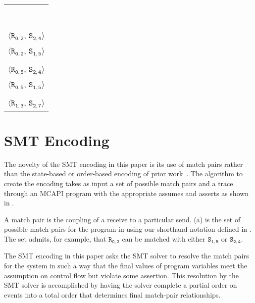 \newsavebox{\boxMP}
\begin{lrbox}{\boxMP}
\normalsize
\begin{tabular}[t]{l}
\\\\\\\\\\\\\\\\\\
$\langle\mathtt{R_{0,2}}$, $\mathtt{S_{2,4}}\rangle$\\
$\langle\mathtt{R_{0,2}}$, $\mathtt{S_{1,5}}\rangle$\\
\\
$\langle\mathtt{R_{0,5}}$, $\mathtt{S_{2,4}}\rangle$\\
$\langle\mathtt{R_{0,5}}$, $\mathtt{S_{1,5}}\rangle$\\
\\
$\langle\mathtt{R_{1,3}}$, $\mathtt{S_{2,7}}\rangle$\\
\end{tabular}
\end{lrbox}

\section{SMT Encoding}\label{sec:smt}

The novelty of the SMT encoding in this paper is its use of match
pairs rather than the state-based or order-based encoding of prior
work~\cite{elwakil:padtad10,elwakil:atva10}. The algorithm to create
the encoding takes as input a set of possible match pairs and a trace
through an MCAPI program with the appropriate assumes and asserts as
shown in .

A match pair is the coupling of a receive to a particular
send. (a) is the set of possible match pairs for the
program in  using our shorthand notation defined in
. The set admits, for example, that
$\mathtt{R_{0,2}}$ can be matched with either $\mathtt{S_{1,5}}$ or
$\mathtt{S_{2,4}}$.

The SMT encoding in this paper asks the SMT solver to resolve the
match pairs for the system in such a way that the final values of
program variables meet the assumption on control flow but violate some
assertion. This resolution by the SMT solver is accomplished by having
the solver complete a partial order on events into a total order that
determines final match-pair relationships.


